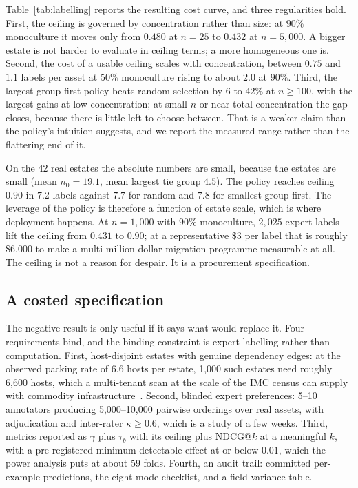 \documentclass[journal,10pt]{IEEEtran}
\newcommand{\tb}{\tau_b}
\newcommand{\nzero}{n_0}
\begin{document}
Table~\ref{tab:labelling} reports the resulting cost curve, and three regularities hold. First, the
ceiling is governed by concentration rather than size: at $90\%$ monoculture it moves only from
$0.480$ at $n=25$ to $0.432$ at $n=5{,}000$. A bigger estate is not harder to evaluate in ceiling
terms; a more homogeneous one is. Second, the cost of a usable ceiling scales with concentration,
between $0.75$ and $1.1$ labels per asset at $50\%$ monoculture rising to about $2.0$ at $90\%$.
Third, the largest-group-first policy beats random selection by $6$ to $42\%$ at $n\ge100$, with the
largest gains at low concentration; at small $n$ or near-total concentration the gap closes,
because there is little left to choose between. That is a weaker claim than the policy's intuition
suggests, and we report the measured range rather than the flattering end of it.

On the 42 real estates the absolute numbers are small, because the estates are small (mean
$\nzero=19.1$, mean largest tie group $4.5$). The policy reaches ceiling $0.90$ in $7.2$ labels
against $7.7$ for random and $7.8$ for smallest-group-first. The leverage of the policy is therefore
a function of estate scale, which is where deployment happens. At $n=1{,}000$ with $90\%$
monoculture, $2{,}025$ expert labels lift the ceiling from $0.431$ to $0.90$; at a representative
\$3 per label that is roughly \$6{,}000 to make a multi-million-dollar migration programme
measurable at all. The ceiling is not a reason for despair. It is a procurement specification.

\subsection{A costed specification}

The negative result is only useful if it says what would replace it. Four requirements bind, and
the binding constraint is expert labelling rather than computation. First, host-disjoint estates
with genuine dependency edges: at the observed packing rate of 6.6 hosts per estate, 1{,}000 such
estates need roughly 6{,}600 hosts, which a multi-tenant scan at the scale of the IMC census can
supply with commodity infrastructure~\cite{mindthegap2026}. Second, blinded expert preferences:
5--10 annotators producing 5{,}000--10{,}000 pairwise orderings over real assets, with adjudication
and inter-rater $\kappa\ge0.6$, which is a study of a few weeks. Third, metrics reported as $\gamma$
plus $\tb$ with its ceiling plus NDCG@$k$ at a meaningful $k$, with a pre-registered minimum
detectable effect at or below $0.01$, which the power analysis puts at about 59 folds. Fourth, an
audit trail: committed per-example predictions, the eight-mode checklist, and a field-variance
table.
\end{document}
